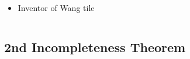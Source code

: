 \begin{frame}
\begin{columns}
\begin{column}{.6\textwidth}
\begin{itemize}[<+->]
\item Inventor of Wang tile



      \end{itemize}
    \end{column}
  \end{columns}
\end{frame}

\subsection{2nd Incompleteness Theorem}


